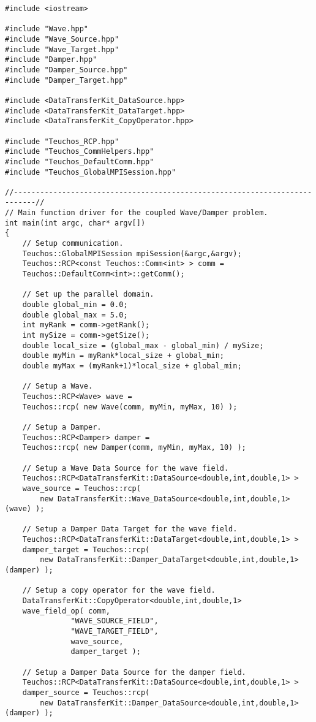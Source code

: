 \documentclass[letterpaper]{article}
\begin{document}
\begin{lstlisting}
#include <iostream>

#include "Wave.hpp"
#include "Wave_Source.hpp"
#include "Wave_Target.hpp"
#include "Damper.hpp"
#include "Damper_Source.hpp"
#include "Damper_Target.hpp"

#include <DataTransferKit_DataSource.hpp>
#include <DataTransferKit_DataTarget.hpp>
#include <DataTransferKit_CopyOperator.hpp>

#include "Teuchos_RCP.hpp"
#include "Teuchos_CommHelpers.hpp"
#include "Teuchos_DefaultComm.hpp"
#include "Teuchos_GlobalMPISession.hpp"

//---------------------------------------------------------------------------//
// Main function driver for the coupled Wave/Damper problem.
int main(int argc, char* argv[])
{
    // Setup communication.
    Teuchos::GlobalMPISession mpiSession(&argc,&argv);
    Teuchos::RCP<const Teuchos::Comm<int> > comm = 
	Teuchos::DefaultComm<int>::getComm();

    // Set up the parallel domain.
    double global_min = 0.0;
    double global_max = 5.0;
    int myRank = comm->getRank();
    int mySize = comm->getSize();
    double local_size = (global_max - global_min) / mySize;
    double myMin = myRank*local_size + global_min;
    double myMax = (myRank+1)*local_size + global_min;

    // Setup a Wave.
    Teuchos::RCP<Wave> wave =
	Teuchos::rcp( new Wave(comm, myMin, myMax, 10) );

    // Setup a Damper.
    Teuchos::RCP<Damper> damper =
	Teuchos::rcp( new Damper(comm, myMin, myMax, 10) ); 

    // Setup a Wave Data Source for the wave field.
    Teuchos::RCP<DataTransferKit::DataSource<double,int,double,1> > 
	wave_source = Teuchos::rcp( 
	    new DataTransferKit::Wave_DataSource<double,int,double,1>(wave) );

    // Setup a Damper Data Target for the wave field.
    Teuchos::RCP<DataTransferKit::DataTarget<double,int,double,1> > 
	damper_target = Teuchos::rcp( 
	    new DataTransferKit::Damper_DataTarget<double,int,double,1>(damper) );

    // Setup a copy operator for the wave field.
    DataTransferKit::CopyOperator<double,int,double,1> 
	wave_field_op( comm,
		       "WAVE_SOURCE_FIELD",
		       "WAVE_TARGET_FIELD",
		       wave_source,
		       damper_target );

    // Setup a Damper Data Source for the damper field.
    Teuchos::RCP<DataTransferKit::DataSource<double,int,double,1> > 
	damper_source = Teuchos::rcp( 
	    new DataTransferKit::Damper_DataSource<double,int,double,1>(damper) );


\end{lstlisting}
\end{document}
